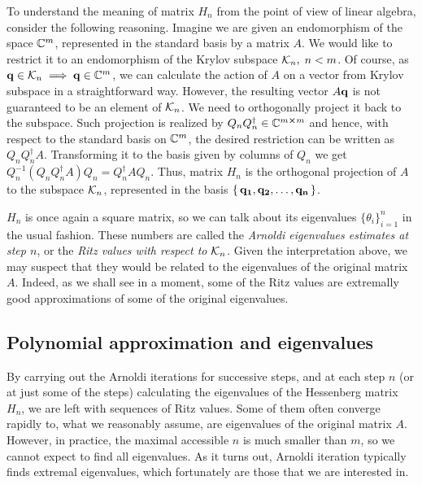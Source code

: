 To understand the meaning
of matrix \(H_n\) from the point of view of linear algebra, consider the following reasoning. Imagine we are
given an endomorphism of the space \(\mathbb{C}^m\), represented in the standard basis by a matrix \(A\).
We would like to restrict it to an endomorphism of the Krylov subspace \(\mathcal{K}_{n},\; n < m\). Of course,
as \(\vectorbold{q} \in \K{n} \implies \vectorbold{q} \in \CC^m\), we can calculate the action of \(A\) on a vector
from Krylov subspace in a straightforward way. However, the resulting vector \(A\vectorbold{q}\) is not guaranteed
to be an element of \(\mathcal{K}_{n}\). We need to orthogonally project it back to the subspace. Such projection
is realized by \(Q_n Q^{\dagger}_n \in \mathbb{C}^{m\cross m}\) and hence, with respect to the standard basis on \(\mathbb{C}^m\),
the desired restriction can be written as \(Q_n Q^{\dagger}_n A\). Transforming it to the basis given by columns of
\(Q_n\) we get \( Q_n^{-1}\left(Q_n Q^{\dagger}_n A\right)Q_n = Q^{\dagger}_n A Q_n\). Thus, matrix \(H_n\)
is the orthogonal projection of \(A\) to the subspace \(\mathcal{K}_{n}\), represented in the basis
\(\{\,\vectorbold{q_1},\vectorbold{q_2},\ldots,\vectorbold{q_n}\,\}\).

\(H_n\) is once again a square matrix, so we can talk about its eigenvalues \(\{\theta_i\}_{i = 1}^n\)
in the usual fashion. These numbers are called the \textit{Arnoldi eigenvalues estimates at step \(n\)}, or
the \textit{Ritz values with respect to \(\mathcal{K}_{n}\)}.
Given the interpretation above, we may suspect that they would be related to the eigenvalues of the original matrix \(A\).
Indeed, as we shall see in a moment, some of the Ritz values are extremally good approximations of some of the
original eigenvalues.


\subsection{Polynomial approximation and eigenvalues}

By carrying out the Arnoldi iterations for successive steps, and at each step \(n\) (or at just some of the steps)
calculating the eigenvalues of the Hessenberg matrix \(H_n\), we are left with sequences of Ritz values. Some
of them often converge rapidly to, what we reasonably assume, are eigenvalues of the original matrix \(A\).
However, in practice, the maximal accessible \(n\) is much smaller than \(m\), so we cannot expect to find
all eigenvalues. As it turns out, Arnoldi iteration typically finds extremal eigenvalues, which fortunately
are those that we are interested in.


